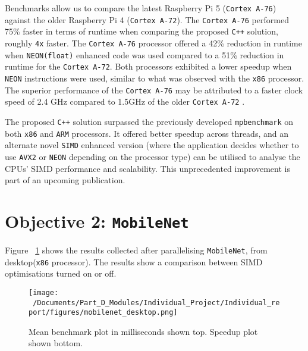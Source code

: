 Benchmarks allow us to compare the latest Raspberry Pi 5 (\texttt{Cortex A-76}) against the older Raspberry Pi 4 (\texttt{Cortex A-72}). The \texttt{Cortex A-76} performed 75\% faster in terms of runtime when comparing the proposed \texttt{C++} solution, roughly \texttt{4x} faster. The \texttt{Cortex A-76} processor offered a 42\% reduction in runtime when \texttt{NEON(float)} enhanced code was used compared to a 51\% reduction in runtime for the \texttt{Cortex A-72}. Both processors exhibited a lower speedup when \texttt{NEON} instructions were used, similar to what was observed with the \texttt{x86} processor. The superior performance of the \texttt{Cortex A-76} may be attributed to a faster clock speed of 2.4 GHz compared to 1.5GHz of the older \texttt{Cortex A-72} \cite{rasp_pi5_pi4_comparision}.

The proposed \texttt{C++} solution surpassed the previously developed \texttt{mpbenchmark}\cite{mpbenchmark_paper} on both \texttt{x86} and \texttt{ARM} processors. It offered better speedup across threads, and an alternate novel \texttt{SIMD} enhanced version (where the application decides whether to use \texttt{AVX2} or \texttt{NEON} depending on the processor type) can be utilised to analyse the CPUs' SIMD performance and scalability. This unprecedented improvement is part of an upcoming publication.

\section{Objective 2: \texttt{MobileNet}}

Figure ~\ref{fig:mobilenet_desktop_plot} shows the results collected after parallelising \texttt{MobileNet}, from desktop(\texttt{x86} processor). The results show a comparison between SIMD optimisations turned on or off. 

\begin{figure}[htbp] %
	\centering
	\texttt{[image: ~/Documents/Part\_D\_Modules/Individual\_Project/Individual\_report/figures/mobilenet\_desktop.png]} %
	\caption{Mean benchmark plot in milliseconds shown top. Speedup plot shown bottom.}
	\label{fig:mobilenet_desktop_plot} %
\end{figure}

